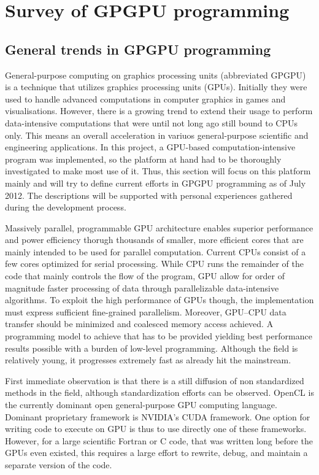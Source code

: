 \chapter{Survey of GPGPU programming}
\section{General trends in GPGPU programming}
General-purpose computing on graphics processing units (abbreviated GPGPU) is a technique that utilizes graphics processing units (GPUs). Initially they were used to handle advanced computations in computer graphics in games and visualisations. However, there is a growing trend to extend their usage to perform data-intensive computations that were until not long ago still bound to CPUs only. This means an overall acceleration in variuos general-purpose scientific and engineering applications. In this project, a GPU-based computation-intensive program was implemented, so the platform at hand had to be thoroughly investigated to make most use of it. Thus, this section will focus on this platform mainly and will try to define current efforts in GPGPU programming as of July 2012. The descriptions will be supported with personal experiences gathered during the development process.

Massively parallel, programmable GPU architecture enables superior performance and power efficiency thorugh thousands of smaller, more efficient cores that are mainly intended to be used for parallel computation. Current CPUs consist of a few cores optimized for serial processing. While CPU runs the remainder of the code that mainly controls the flow of the program, GPU allow for order of magnitude faster processing of data through parallelizable data-intensive algorithms. To exploit the high performance of GPUs though, the implementation must express sufficient fine-grained parallelism. Moreover, GPU–CPU data transfer should be minimized and coalesced memory access achieved. A programming model to achieve that has to be provided yielding best performance results possible with a burden of low-level programming. Although the field is relatively young, it progresses extremely fast as already hit the mainstream.

First immediate observation is that there is a still diffusion of non standardized methods in the field, although standardization efforts can be observed. OpenCL is the currently dominant open general-purpose GPU computing language. Dominant proprietary framework is NVIDIA's CUDA framework. One option for writing code to execute on GPU is thus to use directly one of these frameworks. However, for a large scientific Fortran or C code, that was written long before the GPUs even existed, this requires a large effort to rewrite, debug, and maintain a separate version of the code.

